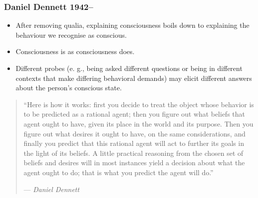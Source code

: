 \documentclass[UTF8,11pt,colorlinks,compress,openany]{beamer}%
\begin{document}
\begin{frame}\frametitle{Daniel Dennett 1942--}
\begin{itemize}
	\item After removing qualia, explaining consciousness boils down to explaining the behaviour we recognise as conscious.
	\item Consciousness is as consciousness does.
	\item Different probes (e. g., being asked different questions or being in different contexts that make differing behavioral demands) may elicit different answers about the person's conscious state.
\end{itemize}
\begin{quote}
``Here is how it works: first you decide to treat the object whose behavior is to be predicted as a rational agent; then you figure out what beliefs that agent ought to have, given its place in the world and its purpose. Then you figure out what desires it ought to have, on the same considerations, and finally you predict that this rational agent will act to further its goals in the light of its beliefs. A little practical reasoning from the chosen set of beliefs and desires will in most instances yield a decision about what the agent ought to do; that is what you predict the agent will do.''\par
\hfill --- \textsl{Daniel Dennett}
\end{quote}
\end{frame}
\end{document}
